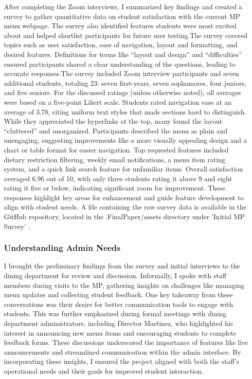 \documentclass[10pt,twocolumn]{article}
\begin{document}
After completing the Zoom interviews, I summarized key findings and created a survey to gather quantitative data on student satisfaction with the current MP menu webpage. The survey also identified features students were most excited about and helped shortlist participants for future user testing.The survey covered topics such as user satisfaction, ease of navigation, layout and formatting, and desired features. Definitions for terms like “layout and design” and “difficulties” ensured participants shared a clear understanding of the questions, leading to accurate responses.The survey included Zoom interview participants and seven additional students, totaling 23: seven first-years, seven sophomores, four juniors, and five seniors. For the discussed ratings (unless otherwise noted), all averages were based on a five-point Likert scale. Students rated navigation ease at an average of 3.78, citing uniform text styles that made sections hard to distinguish. While they appreciated the hyperlinks at the top, many found the layout “cluttered” and unorganized. Participants described the menu as plain and unengaging, suggesting improvements like a more visually appealing design and a chart or table format for easier navigation. Top requested features included dietary restriction filtering, weekly email notifications, a menu item rating system, and a quick link search feature for unfamiliar items. Overall satisfaction averaged 6.96 out of 10, with only three students rating it above 9 and eight rating it five or below, indicating significant room for improvement. These responses highlight key areas for enhancement and guide feature development to align with student needs. A file containing the raw survey data is available in the GitHub repository, located in the .FinalPaper/assets directory under 'Initial MP Survey' \cite{GitHubRepo}.

\subsubsection{Understanding Admin Needs}
 I brought the preliminary findings from the survey and initial interviews to the dining department for review and discussion. Informally, I spoke with staff members during visits to the MP, gathering insights on challenges like managing menu updates and collecting student feedback. One key takeaway from these conversations was their desire for better communication tools to engage with students. This was further emphasized during formal meetings with dining department administrators, including Director Martinez, who highlighted his interest in announcing new menu items and encouraging students to complete feedback forms. These discussions underscored the importance of features like live announcements and streamlined communication within the admin interface. By incorporating these insights, I ensured the project aligned with both the staff’s operational needs and their goals for improved student interaction.
\end{document}
